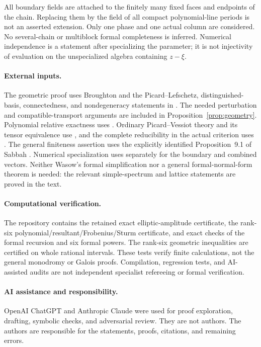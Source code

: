 \documentclass[11pt]{article}
\numberwithin{equation}{section}
\theoremstyle{definition}
\theoremstyle{remark}
\begin{document}
All boundary fields are attached to the finitely many fixed faces and
endpoints of the chain. Replacing them by the field of all compact
polynomial-line periods is not an asserted extension. Only one phase and
one actual column are considered. No several-chain or multiblock formal
completeness is inferred. Numerical independence is a statement after
specializing the parameter; it is not injectivity of evaluation on the
unspecialized algebra containing $z-\xi$.

\paragraph{External inputs.}
The geometric proof uses Broughton \cite[Definition~3.1, Theorem~1.2,
pp.~229--231]{Br} and the Picard--Lefschetz, distinguished-basis,
connectedness, and nondegeneracy statements in
\cite[\S1.3; \S2.1; Theorem~3.3; pp.~100, 411]{AGV}.
The needed perturbation and compatible-transport arguments are included
in Proposition~\ref{prop:geometry}. Polynomial relative exactness uses
\cite[Definitions~1.3--1.4, Theorem~1.5]{Bonnet}.
Ordinary Picard--Vessiot theory and its tensor equivalence use
\cite[Theorem~1.5.2]{Singer}, and the complete reducibility in the actual
criterion uses \cite[Proposition~15.15, Corollary~22.43]{MilneAG}.
The general finiteness assertion uses the explicitly identified
Proposition~9.1 of Sabbah \cite{Sabbah}.
Numerical specialization uses \cite[Theorem~1.1]{Beukers} separately for
the boundary and combined vectors. Neither Wasow's formal simplification
nor a general formal-normal-form theorem is needed: the relevant
simple-spectrum and lattice statements are proved in the text.

\paragraph{Computational verification.}
The repository contains the retained exact elliptic-amplitude certificate,
the rank-six polynomial/resultant/Frobenius/Sturm certificate, and exact
checks of the formal recursion and six formal powers. The rank-six
geometric inequalities are certified on whole rational intervals.
These tests verify finite calculations, not the general monodromy or
Galois proofs. Compilation, regression tests, and AI-assisted audits are
not independent specialist refereeing or formal verification.

\paragraph{AI assistance and responsibility.}
OpenAI ChatGPT and Anthropic Claude were used for proof exploration,
drafting, symbolic checks, and adversarial review. They are not authors.
The authors are responsible for the statements, proofs, citations, and
remaining errors.
\end{document}
